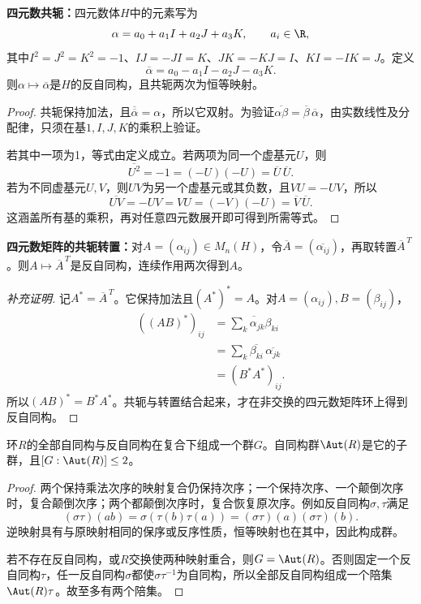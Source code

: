\begin{example}
\textbf{四元数共轭：}四元数体$H$中的元素写为
\[
\alpha=a_0+a_1I+a_2J+a_3K,\qquad a_i\in\R,
\]
其中$I^2=J^2=K^2=-1$、$IJ=-JI=K$、$JK=-KJ=I$、$KI=-IK=J$。定义
\[
\overline\alpha=a_0-a_1I-a_2J-a_3K.
\]
则$\alpha\mapsto\overline\alpha$是$H$的反自同构，且共轭两次为恒等映射。
\end{example}
\begin{proof}
共轭保持加法，且$\overline{\overline\alpha}=\alpha$，所以它双射。为验证$\overline{\alpha\beta}=\overline\beta\,\overline\alpha$，由实数线性及分配律，只须在基$1,I,J,K$的乘积上验证。

若其中一项为1，等式由定义成立。若两项为同一个虚基元$U$，则
\[
\overline{U^2}=-1=(-U)(-U)=\overline U\,\overline U.
\]
若为不同虚基元$U,V$，则$UV$为另一个虚基元或其负数，且$VU=-UV$，所以
\[
\overline{UV}=-UV=VU=(-V)(-U)=\overline V\,\overline U.
\]
这涵盖所有基的乘积，再对任意四元数展开即可得到所需等式。
\end{proof}

\begin{example}
\textbf{四元数矩阵的共轭转置：}对$A=(\alpha_{ij})\in M_n(H)$，令$\overline A=(\overline{\alpha_{ij}})$，再取转置$\overline A^{\,T}$。则$A\mapsto\overline A^{\,T}$是反自同构，连续作用两次得到$A$。
\end{example}
\begin{proof}[补充证明]
记$A^*=\overline A^{\,T}$。它保持加法且$(A^*)^*=A$。对$A=(\alpha_{ij}),B=(\beta_{ij})$，
\begin{align*}
((AB)^*)_{ij}
&=\overline{\sum_k\alpha_{jk}\beta_{ki}}\\
&=\sum_k\overline{\beta_{ki}}\,\overline{\alpha_{jk}}\\
&=(B^*A^*)_{ij}.
\end{align*}
所以$(AB)^*=B^*A^*$。共轭与转置结合起来，才在非交换的四元数矩阵环上得到反自同构。
\end{proof}

\begin{proposition}
环$R$的全部自同构与反自同构在复合下组成一个群$G$。自同构群$\Aut(R)$是它的子群，且$[G:\Aut(R)]\leq2$。
\end{proposition}
\begin{proof}
两个保持乘法次序的映射复合仍保持次序；一个保持次序、一个颠倒次序时，复合颠倒次序；两个都颠倒次序时，复合恢复原次序。例如反自同构$\sigma,\tau$满足
\[
(\sigma\tau)(ab)=\sigma(\tau(b)\tau(a))
=(\sigma\tau)(a)(\sigma\tau)(b).
\]
逆映射具有与原映射相同的保序或反序性质，恒等映射也在其中，因此构成群。

若不存在反自同构，或$R$交换使两种映射重合，则$G=\Aut(R)$。否则固定一个反自同构$\tau$，任一反自同构$\sigma$都使$\sigma\tau^{-1}$为自同构，所以全部反自同构组成一个陪集$\Aut(R)\tau$。故至多有两个陪集。
\end{proof}


